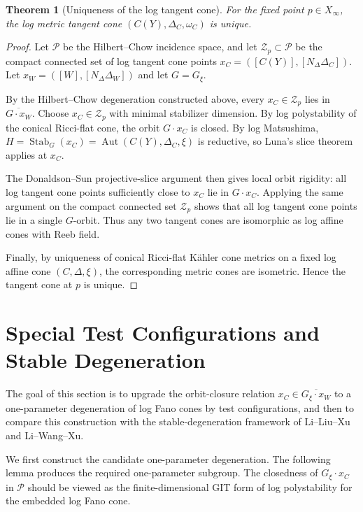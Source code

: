 \documentclass[11pt]{amsart}
\newtheorem{theorem}{Theorem}[section]
\theoremstyle{definition}
\theoremstyle{remark}
\begin{document}
\begin{theorem}[Uniqueness of the log tangent cone]
For the fixed point $p\in X_\infty$, the log metric tangent cone
$(C(Y),\Delta_C,\omega_C)$ is unique.
\end{theorem}

\begin{proof}
Let $\mathcal P$ be the Hilbert--Chow incidence space, and let
$\mathcal Z_p \subset \mathcal P$ be the compact connected set of log tangent cone
points
$x_C=([C(Y)],[N_\Delta\Delta_C])$.
Let
$x_W=([W],[N_\Delta\Delta_W])$
and let $G=G_\xi$.

By the Hilbert--Chow degeneration constructed above, every
$x_C\in \mathcal Z_p$ lies in $\overline{G\cdot x_W}$. Choose
$x_C\in \mathcal Z_p$ with minimal stabilizer dimension. By log polystability of
the conical Ricci-flat cone, the orbit $G\cdot x_C$ is closed. By log
Matsushima,
$H=\operatorname{Stab}_G(x_C)=\operatorname{Aut}(C(Y),\Delta_C,\xi)$
is reductive, so Luna's slice theorem applies at $x_C$.

The Donaldson--Sun projective-slice argument \cite[Theorem~1.3]{DSII} then gives local orbit rigidity: all log tangent
cone points sufficiently close to $x_C$ lie in $G\cdot x_C$. Applying the same
argument on the compact connected set $\mathcal Z_p$ shows that all log tangent
cone points lie in a single $G$-orbit. Thus any two tangent cones are
isomorphic as log affine cones with Reeb field.

Finally, by uniqueness of conical Ricci-flat Kähler cone metrics on a fixed log
affine cone $(C,\Delta,\xi)$, the corresponding metric cones are isometric.
Hence the tangent cone at $p$ is unique.
\end{proof}

\section{Special Test Configurations and Stable Degeneration}

The goal of this section is to upgrade the orbit-closure relation
$x_C\in\overline{G_\xi\cdot x_W}$ to a one-parameter degeneration of log Fano
cones by test configurations, and then to compare this construction with the
stable-degeneration framework of Li--Liu--Xu and Li--Wang--Xu.

We first construct the candidate one-parameter degeneration. The following
lemma produces the required one-parameter subgroup. The closedness of
$G_\xi\cdot x_C$ in $\mathcal P$ should be viewed as the finite-dimensional
GIT form of log polystability for the embedded log Fano cone.
\end{document}

